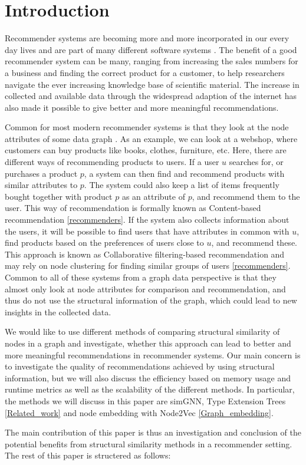 \section{Introduction}
  Recommender systems are becoming more and more incorporated in our every day lives and are part of many different software systems \cite{recommender_e-comerce}. The benefit of a good recommender system can be many,  ranging from increasing the sales numbers for a business and finding the correct product for a customer, to help researchers navigate the ever increasing knowledge base of scientific material. The increase in collected and available data through the widespread adaption of the internet has also made it possible to give better and more meaningful recommendations.

  Common for most modern recommender systems is that they look at the node attributes of some data graph \cite{Ricci2015}. As an example, we can look at a webshop, where customers can buy products like books, clothes, furniture, etc. Here, there are different ways of recommending products to users. If a user $u$ searches for, or purchases a product $p$, a system can then find and recommend products with similar attributes to $p$. The system could also keep a list of items frequently bought together with product $p$ as an attribute of $p$, and recommend them to the user. This way of recommendation is formally known as Content-based recommendation \ref{recommenders}. If the system also collects information about the users, it will be possible to find users that have attributes in common with $u$, find products based on the preferences of users close to $u$, and recommend these. This approach is known as Collaborative filtering-based recommendation and may rely on node clustering for finding similar groups of users \ref{recommenders}. Common to all of these systems from a graph data perspective is that they almost only look at node attributes for comparison and recommendation, and thus do not use the structural information of the graph, which could lead to new insights in the collected data.

  We would like to use different methods of comparing structural similarity of nodes in a graph and investigate, whether this approach can lead to better and more meaningful recommendations in recommender systems. Our main concern is to investigate the quality of recommendations achieved by using structural information, but we will also discuss the efficiency based on memory usage and runtime metrics as well as the scalability of the different methods. In particular, the methods we will discuss in this paper are simGNN, Type Extension Trees \ref{Related_work} and node embedding with Node2Vec \ref{Graph_embedding}.

  The main contribution of this paper is thus an investigation and conclusion of the potential benefits from structural similarity methods in a recommender setting. The rest of this paper is structered as follows:
